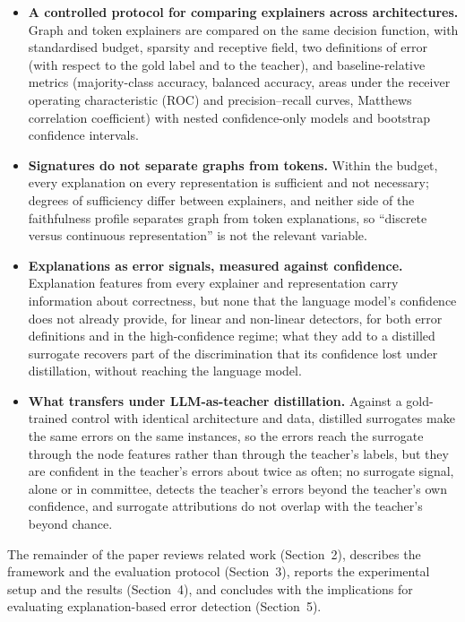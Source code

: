 \documentclass[preprint, times, review, 10pt]{elsarticle}
\begin{document}
\begin{itemize}
    \item \textbf{A controlled protocol for comparing explainers across architectures.} Graph and token explainers are compared on the same decision function, with standardised budget, sparsity and receptive field, two definitions of error (with respect to the gold label and to the teacher), and baseline-relative metrics (majority-class accuracy, balanced accuracy, areas under the receiver operating characteristic (ROC) and precision--recall curves, Matthews correlation coefficient) with nested confidence-only models and bootstrap confidence intervals.
    \item \textbf{Signatures do not separate graphs from tokens.} Within the budget, every explanation on every representation is sufficient and not necessary; degrees of sufficiency differ between explainers, and neither side of the faithfulness profile separates graph from token explanations, so ``discrete versus continuous representation'' is not the relevant variable.
    \item \textbf{Explanations as error signals, measured against confidence.} Explanation features from every explainer and representation carry information about correctness, but none that the language model's confidence does not already provide, for linear and non-linear detectors, for both error definitions and in the high-confidence regime; what they add to a distilled surrogate recovers part of the discrimination that its confidence lost under distillation, without reaching the language model.
    \item \textbf{What transfers under LLM-as-teacher distillation.} Against a gold-trained control with identical architecture and data, distilled surrogates make the same errors on the same instances, so the errors reach the surrogate through the node features rather than through the teacher's labels, but they are confident in the teacher's errors about twice as often; no surrogate signal, alone or in committee, detects the teacher's errors beyond the teacher's own confidence, and surrogate attributions do not overlap with the teacher's beyond chance.
\end{itemize}

The remainder of the paper reviews related work (Section~2), describes the framework and the evaluation protocol (Section~3), reports the experimental setup and the results (Section~4), and concludes with the implications for evaluating explanation-based error detection (Section~5).
\end{document}
